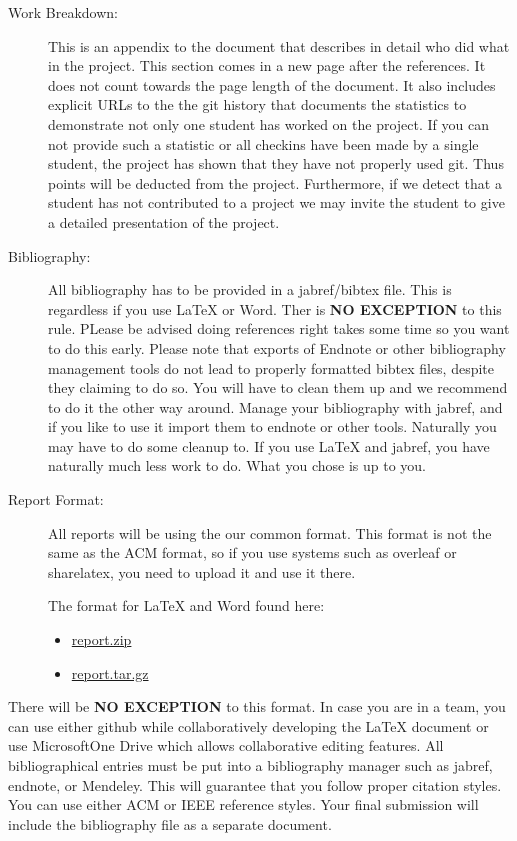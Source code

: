 \begin{description}
\item[Work Breakdown:]
This is an appendix to the document that describes in detail who did
what in the project. This section comes in a new page after the
references. It does not count towards the page length of the document.
It also includes explicit URLs to the the git history that documents the
statistics to demonstrate not only one student has worked on the
project. If you can not provide such a statistic or all checkins have
been made by a single student, the project has shown that they have not
properly used git. Thus points will be deducted from the project.
Furthermore, if we detect that a student has not contributed to a
project we may invite the student to give a detailed presentation of the
project.
\item[Bibliography:]
All bibliography has to be provided in a jabref/bibtex file. This is
regardless if you use LaTeX or Word. Ther is \textbf{NO EXCEPTION} to
this rule. PLease be advised doing references right takes some time so
you want to do this early. Please note that exports of Endnote or other
bibliography management tools do not lead to properly formatted bibtex
files, despite they claiming to do so. You will have to clean them up
and we recommend to do it the other way around. Manage your bibliography
with jabref, and if you like to use it import them to endnote or other
tools. Naturally you may have to do some cleanup to. If you use LaTeX
and jabref, you have naturally much less work to do. What you chose is
up to you.
\item[Report Format:]
All reports will be using the our common format. This format is not the
same as the ACM format, so if you use systems such as overleaf or
sharelatex, you need to upload it and use it there.

The format for LaTeX and Word found here:

\begin{itemize}
\tightlist
\item
  \href{https://github.com/cloudmesh/classes/raw/master/docs/source/format/report.zip}{report.zip}
\item
  \href{https://github.com/cloudmesh/classes/raw/master/docs/source/format/report.tar.gz}{report.tar.gz}
\end{itemize}
\end{description}

There will be \textbf{NO EXCEPTION} to this format. In case you are in a
team, you can use either github while collaboratively developing the
LaTeX document or use MicrosoftOne Drive which allows collaborative
editing features. All bibliographical entries must be put into a
bibliography manager such as jabref, endnote, or Mendeley. This will
guarantee that you follow proper citation styles. You can use either ACM
or IEEE reference styles. Your final submission will include the
bibliography file as a separate document.

